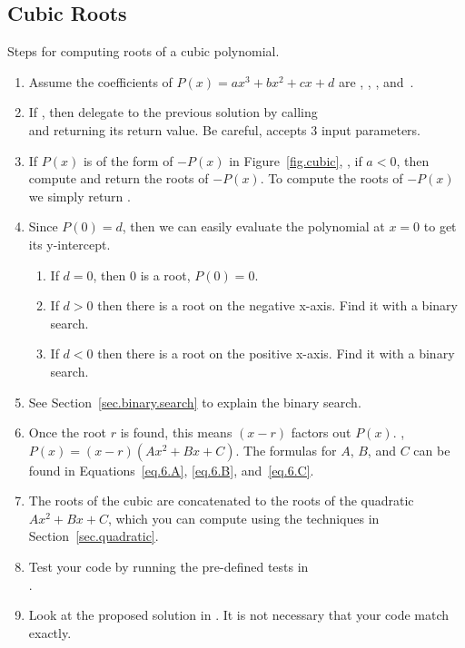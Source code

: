 \subsection{Cubic Roots}
\label{sec.cubic.roots}

Steps for computing roots of a cubic polynomial.

\begin{enumerate}
\item Assume the coefficients of $P(x) = a x^3 + b x^2 + c x + d$ are
  ,  ,  ,  and~.
\item If , then delegate to the previous solution by
  calling \\
   and returning its return
  value.  Be careful,  accepts 3 input
  parameters.
\item If $P(x)$ is of the form of $-P(x)$ in Figure~\ref{fig.cubic},
  \ie, if $a<0$, then compute and return the roots of $-P(x)$.  To
  compute the roots of $-P(x)$ we simply return
  .
\item Since $P(0) = d$, then we can easily evaluate the polynomial at $x=0$ to get its y-intercept.
  \begin{enumerate}
  \item If $d = 0$, then 0 is a root, $P(0) = 0$.
  \item If $d>0$ then there is a root on the negative x-axis.  Find it with a binary search.
  \item If $d<0$ then there is a root on the positive x-axis. Find it with a binary search.
  \end{enumerate}
\item See Section~\ref{sec.binary.search} to explain the binary search.
\item Once the root $r$ is found, this means $(x-r)$ factors out $P(x)$. \Ie,
  ${P(x) = (x-r)(A x^2 + B x + C)}$.  The formulas for $A$, $B$, and $C$ can be found
  in Equations~\eqref{eq.6.A}, \eqref{eq.6.B}, and~\eqref{eq.6.C}.
\item The roots of the cubic are \code{[r]} concatenated to the roots of the quadratic 
  $A x^2 + B x + C$, which you can compute using the techniques in Section~\ref{sec.quadratic}.


\item Test your code by running the pre-defined tests in \\
  .

\item Look at the proposed solution in .  It is not necessary that your code match exactly.



\end{enumerate}



